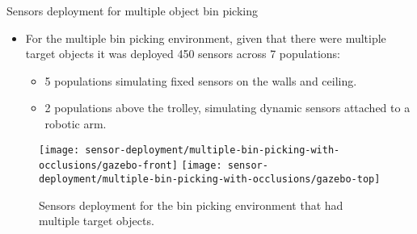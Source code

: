 \begin{frame}{Sensors deployment for multiple object bin picking}
	\begin{itemize}
		\item For the multiple bin picking environment, given that there were multiple target objects it was deployed 450 sensors across 7 populations:
		\begin{itemize}
			\item 5 populations simulating fixed sensors on the walls and ceiling.
			\item 2 populations above the trolley, simulating dynamic sensors attached to a robotic arm.
		\end{itemize}
	\end{itemize}
	\begin{figure}
		\centering
		\texttt{[image: sensor-deployment/multiple-bin-picking-with-occlusions/gazebo-front]}\hspace{2em}
		\texttt{[image: sensor-deployment/multiple-bin-picking-with-occlusions/gazebo-top]}
		\caption{Sensors deployment for the bin picking environment that had multiple target objects.}
	\end{figure}
\end{frame}
